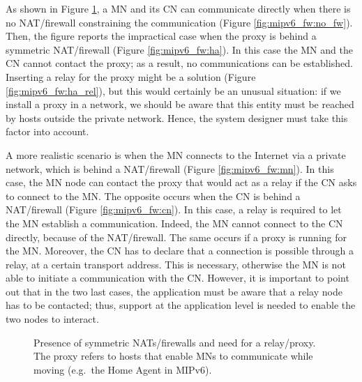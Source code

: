 \documentclass[preprint,12pt]{elsarticle}
\begin{document}
As shown in Figure \ref{fig:mipv6_fw}, a MN and its CN can communicate directly 
when there is no NAT/firewall constraining the communication (Figure 
\ref{fig:mipv6_fw:no_fw}).
Then, the figure reports the impractical case when the proxy is behind a 
symmetric NAT/firewall (Figure \ref{fig:mipv6_fw:ha}). In this case the MN and 
the CN cannot contact the proxy; as a result, no communications can be established.  Inserting a relay for the proxy might be a solution (Figure 
\ref{fig:mipv6_fw:ha_rel}), but this would certainly be an unusual situation: if we 
install a proxy in a network, we should be aware that this entity must be 
reached by hosts outside the private network. Hence, the system designer must 
take this factor into account.

A more realistic scenario is when the MN connects to the Internet via a private 
network, which is behind a NAT/firewall (Figure \ref{fig:mipv6_fw:mn}). In this 
case, the MN node can contact the proxy that would act as a relay if the CN asks 
to connect to the MN.
The opposite occurs when the CN is behind a NAT/firewall 
(Figure \ref{fig:mipv6_fw:cn}). 
In this case, a relay is required to let the MN establish a communication. Indeed, the MN cannot connect to the CN directly, because of the NAT/firewall. The same occurs if a proxy is running for the MN. Moreover, the CN has to declare that a connection is possible through a relay, at a certain transport address.
This is necessary, otherwise the MN is not able to initiate a communication with the CN. 
However, it is important to point out that in the two last cases, the 
application must be aware that a relay node has to be contacted; thus,
support at the application level is needed to enable the two nodes to interact. 

\begin{figure}[H]
   \centering
  \caption{Presence of symmetric NATs/firewalls and need for a 
relay/proxy. The proxy refers to hosts that enable MNs to 
communicate while moving (e.g.~the Home Agent in MIPv6).}
  \label{fig:mipv6_fw}
\end{figure}
\end{document}
